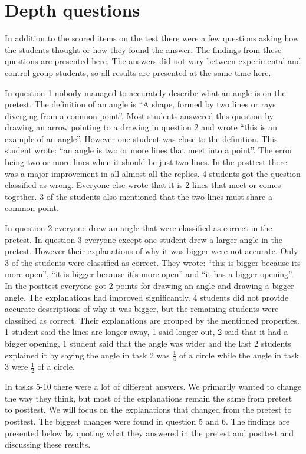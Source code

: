 \chapter{Depth questions}
In addition to the scored items on the test there were a few questions asking how the students thought or how they found the answer. The findings from these questions are presented here. The answers did not vary between experimental and control group students, so all results are presented at the same time here.

\bigskip\noindent
In question 1 nobody managed to accurately describe what an angle is on the pretest. The definition of an angle is ``A shape, formed by two lines or rays diverging from a common point''. Most students answered this question by drawing an arrow pointing to a drawing in question 2 and wrote ``this is an example of an angle''. However one student was close to the definition. This student wrote: ``an angle is two or more lines that meet into a point''. The error being two or more lines when it should be just two lines. In the posttest there was a major improvement in all almost all the replies. 4 students got the question classified as wrong. Everyone else wrote that it is 2 lines that meet or comes together. 3 of the students also mentioned that the two lines must share a common point.

\bigskip\noindent
In question 2 everyone drew an angle that were classified as correct in the pretest. In question 3 everyone except one student drew a larger angle in the pretest. However their explanations of why it was bigger were not accurate. Only 3 of the students were classified as correct. They wrote: ``this is bigger because its more open'', ``it is bigger because it's more open'' and ``it has a bigger opening''. In the posttest everyone got 2 points for drawing an angle and drawing a bigger angle. The explanations had improved significantly. 4 students did not provide accurate descriptions of why it was bigger, but the remaining students were classified as correct. Their explanations are grouped by the mentioned properties. 1 student said the lines are longer away, 1 said longer out, 2 said that it had a bigger opening, 1 student said that the angle was wider and the last 2 students explained it by saying the angle in task 2 was $\frac{1}{4}$ of a circle while the angle in task 3 were $\frac{1}{2}$ of a circle.

\bigskip\noindent
In tasks 5-10 there were a lot of different answers. We primarily wanted to change the way they think, but most of the explanations remain the same from pretest to posttest. We will focus on the explanations that changed from the pretest to posttest. The biggest changes were found in question 5 and 6. The findings are presented below by quoting what they answered in the pretest and posttest and discussing these results.

